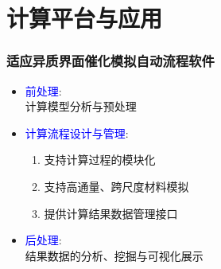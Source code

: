 
\section{计算平台与应用}
\begin{frame}
	\frametitle{适应异质界面催化模拟自动流程软件}
\begin{minipage}[c]{0.42\linewidth}
\begin{itemize}
\vspace*{-2.75in}
	\item \textcolor{blue}{前处理}:\\
		计算模型分析与预处理
	\item \textcolor{blue}{计算流程设计与管理}:\\
		\begin{enumerate}
			\item 支持计算过程的模块化
			\item 支持高通量、跨尺度材料模拟
			\item 提供计算结果数据管理接口
		\end{enumerate}
	\item \textcolor{blue}{后处理}:\\
		结果数据的分析、挖掘与可视化展示
\end{itemize}
\end{minipage}

\end{frame}

